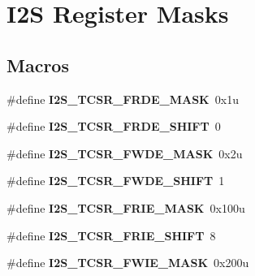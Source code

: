 \hypertarget{group___i2_s___register___masks}{}\section{I2\+S Register Masks}
\label{group___i2_s___register___masks}
\subsection*{Macros}
\begin{DoxyCompactItemize}
\item 
\hypertarget{group___i2_s___register___masks_gae565812ade16ef43b2c8de0da9434dc7}{}\#define {\bfseries I2\+S\+\_\+\+T\+C\+S\+R\+\_\+\+F\+R\+D\+E\+\_\+\+M\+A\+S\+K}~0x1u\label{group___i2_s___register___masks_gae565812ade16ef43b2c8de0da9434dc7}

\item 
\hypertarget{group___i2_s___register___masks_ga625ff0e116f205afc5810d46b33889e8}{}\#define {\bfseries I2\+S\+\_\+\+T\+C\+S\+R\+\_\+\+F\+R\+D\+E\+\_\+\+S\+H\+I\+F\+T}~0\label{group___i2_s___register___masks_ga625ff0e116f205afc5810d46b33889e8}

\item 
\hypertarget{group___i2_s___register___masks_ga1ee38c9bb8913b7ad39101588a3b6f81}{}\#define {\bfseries I2\+S\+\_\+\+T\+C\+S\+R\+\_\+\+F\+W\+D\+E\+\_\+\+M\+A\+S\+K}~0x2u\label{group___i2_s___register___masks_ga1ee38c9bb8913b7ad39101588a3b6f81}

\item 
\hypertarget{group___i2_s___register___masks_ga711259f1f84d00f66491a4369794c9be}{}\#define {\bfseries I2\+S\+\_\+\+T\+C\+S\+R\+\_\+\+F\+W\+D\+E\+\_\+\+S\+H\+I\+F\+T}~1\label{group___i2_s___register___masks_ga711259f1f84d00f66491a4369794c9be}

\item 
\hypertarget{group___i2_s___register___masks_gaa4df5fe488cb4d2acb0bfd546f660507}{}\#define {\bfseries I2\+S\+\_\+\+T\+C\+S\+R\+\_\+\+F\+R\+I\+E\+\_\+\+M\+A\+S\+K}~0x100u\label{group___i2_s___register___masks_gaa4df5fe488cb4d2acb0bfd546f660507}

\item 
\hypertarget{group___i2_s___register___masks_gae80718274a142dbe1c9b84baddb880fe}{}\#define {\bfseries I2\+S\+\_\+\+T\+C\+S\+R\+\_\+\+F\+R\+I\+E\+\_\+\+S\+H\+I\+F\+T}~8\label{group___i2_s___register___masks_gae80718274a142dbe1c9b84baddb880fe}

\item 
\hypertarget{group___i2_s___register___masks_ga4cd03b204167fc3671c12fa3462d38fb}{}\#define {\bfseries I2\+S\+\_\+\+T\+C\+S\+R\+\_\+\+F\+W\+I\+E\+\_\+\+M\+A\+S\+K}~0x200u\label{group___i2_s___register___masks_ga4cd03b204167fc3671c12fa3462d38fb}


\end{DoxyCompactItemize}
